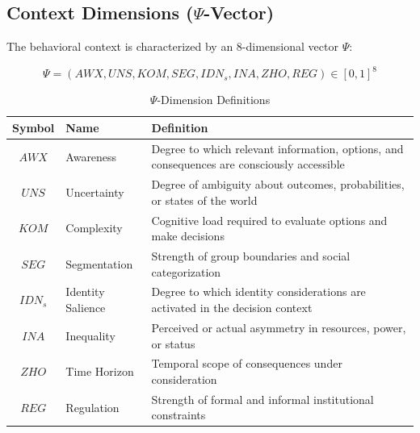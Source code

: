 
\subsection{Context Dimensions ($\Psi$-Vector)}

The behavioral context is characterized by an 8-dimensional vector $\Psi$:

\begin{definition}
\label{def:psi}
\begin{equation}
\Psi = (AWX, UNS, KOM, SEG, IDN_s, INA, ZHO, REG) \in [0,1]^8
\end{equation}
\end{definition}

\begin{table}[htbp]
\centering
\caption{$\Psi$-Dimension Definitions}
\label{tab:psi-definitions}
\renewcommand{\arraystretch}{1.4}
\begin{tabular}{@{}clp{8cm}@{}}
\toprule
\textbf{Symbol} & \textbf{Name} & \textbf{Definition} \\
\midrule
$AWX$ & Awareness & Degree to which relevant information, options, and consequences are consciously accessible \\
$UNS$ & Uncertainty & Degree of ambiguity about outcomes, probabilities, or states of the world \\
$KOM$ & Complexity & Cognitive load required to evaluate options and make decisions \\
$SEG$ & Segmentation & Strength of group boundaries and social categorization \\
$IDN_s$ & Identity Salience & Degree to which identity considerations are activated in the decision context \\
$INA$ & Inequality & Perceived or actual asymmetry in resources, power, or status \\
$ZHO$ & Time Horizon & Temporal scope of consequences under consideration \\
$REG$ & Regulation & Strength of formal and informal institutional constraints \\
\bottomrule
\end{tabular}
\end{table}



